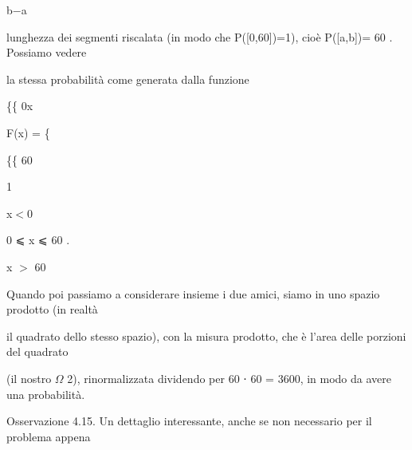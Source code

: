 \documentclass[a4paper,portrait,12pt]{article}
\begin{document}
\begin{flushleft}
b$-$a
\end{flushleft}


\begin{flushleft}
lunghezza dei segmenti riscalata (in modo che P([0,60])=1), cio\`{e} P([a,b])= 60 . Possiamo vedere
\end{flushleft}


\begin{flushleft}
la stessa probabilit\`{a} come generata dalla funzione
\end{flushleft}





\begin{flushleft}
\{\{ 0x
\end{flushleft}


\begin{flushleft}
F(x) = \{
\end{flushleft}


\{\{ 60


1





\begin{flushleft}
x$<$0
\end{flushleft}


\begin{flushleft}
0 ⩽ x ⩽ 60 .
\end{flushleft}


\begin{flushleft}
x $>$ 60
\end{flushleft}





\begin{flushleft}
Quando poi passiamo a considerare insieme i due amici, siamo in uno spazio prodotto (in realt\`{a}
\end{flushleft}


\begin{flushleft}
il quadrato dello stesso spazio), con la misura prodotto, che \`{e} l'area delle porzioni del quadrato
\end{flushleft}


\begin{flushleft}
(il nostro $\Omega$ 2), rinormalizzata dividendo per 60 ⋅ 60 = 3600, in modo da avere una probabilit\`{a}.
\end{flushleft}


\begin{flushleft}
Osservazione 4.15. Un dettaglio interessante, anche se non necessario per il problema appena
\end{flushleft}
\end{document}
